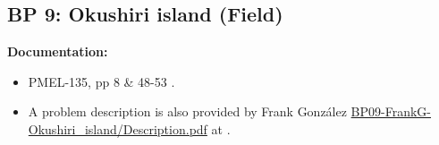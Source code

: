 \newsection

\subsection{BP 9:
 Okushiri island (Field)}

{\bf Documentation:}  
\begin{itemize}
\item PMEL-135, pp 8 \& 48-53 \cite{SynolakisBernard:pmel135}.

\item A problem description is also provided by Frank Gonz\'alez 
\href{https://github.com/rjleveque/nthmp-benchmark-problems/blob/master/BP09-FrankG-Okushiri_island/Description.pdf}
{BP09-FrankG-Okushiri\_island/Description.pdf} 
at \cite{bp-description}.  
\end{itemize} 
